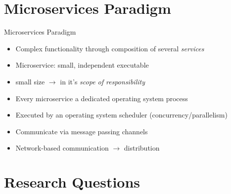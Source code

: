 \documentclass{beamer}
\begin{document}


\section{Microservices Paradigm}


\begin{frame}{Microservices Paradigm}

\pause

\begin{itemize}
  \item Complex functionality through composition of several \textit{services}
  \item Microservice: small, independent executable
  \item \glqq small\grqq{} size $\rightarrow$ in it's \textit{scope of responsibility}
  \item Every microservice a dedicated operating system process
  \item Executed by an operating system scheduler (concurrency/parallelism)
  \item Communicate via message passing channels
  \item Network-based communication $\rightarrow$ distribution
\end{itemize}

\end{frame}


\section{Research Questions}

\end{document}
